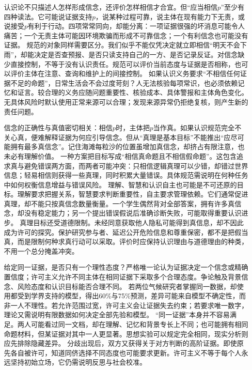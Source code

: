  认识论不只描述人怎样形成信念，还评价怎样相信才合宜。但“应当相信$p$”至少有四种读法。它可能说证据支持$p$，说某种过程可靠，说主体在现有能力下无责，或说接受$p$有利于行动。四项常常同向，却能分离：一项证据很强的坏消息可能令人痛苦；一个无责主体可能因环境欺骗而形成不可靠信念；一个有利信念也可能没有证据。 规范的对象同样需要区分。我们似乎不能仅凭决定就立即相信“明天不会下雨”，却能决定是否查预报、是否只读支持自己的一方、是否记录反证。对信念缺少直接控制，不等于没有认识责任。规范可以评价当前态度与证据是否相称，也可以评价主体在注意、查询和维护上的间接控制。 如果认识义务要求“不相信任何证据不足的命题”，日常生活会不会过度苛刻？人无法核验每项常识，也必须依赖记忆和证言。较合理的义务应随问题重要性、核验成本、具体警报和主体角色变化。无具体风险时默认使用正常来源可以合理；发现来源异常仍拒绝复核，则产生新的责任问题。

信念的正确性与真值密切相关：相信$p$时，主体把$p$当作真。如果认识规范完全不关心真，便难解释证据为何应引导信念。但从“真理是基本目标”不能推出“应尽可能拥有最多真信念”。记住海滩每粒沙的位置虽增加真信念，却挤占有限注意，也未必有理解价值。 一种方案把目标写成“相信真命题且不相信假命题”。这包含追求真与避免错误两方面，而两者可能冲突：只相信逻辑真理可以少错，却错过世界信息；轻易相信则获得一些真理，同时积累大量错误。具体规范需说明在何种任务中如何权衡信息增益与错误风险。 理解、智慧和认识自主也可能是不可还原的目标。理解要求把握关系，智慧要求判断重要性，自主要求管理依赖。它们通常促进真理，却不能只按真信念数量衡量。一个学生偶然背对全部答案，拥有许多真信念，却没有稳定能力；另一个提出错误假说后准确诊断失败，可能取得重要认识进步。 真理目标还受道德限制。未经同意获取他人隐私可能得到真信息，却不因此成为许可的探究。保护研究参与者、延迟公开危险信息和尊重保密，都不是把假当真，而是限制何种求真行动可以采取。评价时应保持认识理由与道德理由的种类，不用一个总分掩盖冲突。

给定同一证据，是否只有一个理性态度？严格唯一论认为证据决定一个信念或精确置信度；许可主义允许不同主体在相同证据下采取多个合理态度。争论触及背景信念、风险态度和认识目标能否合理不同。 若两位气候研究者掌握同一数据，却使用都受到学界支持的模型，得出60\%与75\%预测，差异可能来自模型不确定性，而非一人不理性。若允许范围过宽，许可主义会让证据失去约束；若要求唯一数字，理论又需说明有限数据如何决定全部先验和模型。 “同一证据”本身并不容易满足。两人可能看过同一文档，却在理解、记忆和背景专长上不同；也可能拥有相同命题材料，但某证据对其中一人更显著。思想实验可以规定完全相同，现实分析则应先排除隐藏差异。 分歧出现后，双方又获得关于对方判断的高阶证据。即使原先各自被许可，知道同侪选择不同态度也可能要求更新。许可主义不等于每个人永远坚持初始立场，它仍需说明反思与社会校准。

